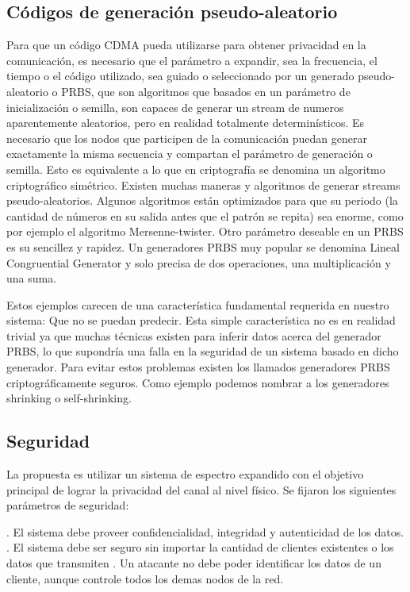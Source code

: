 \subsection{Códigos de generación pseudo-aleatorio}
\label{PRNGs} 
Para que un código CDMA pueda utilizarse para obtener privacidad en la comunicación, es necesario que el parámetro a expandir, sea la frecuencia, el tiempo o el código utilizado, sea guiado o seleccionado por un generado pseudo-aleatorio o PRBS, que son algoritmos que basados en un parámetro de inicialización o semilla, son capaces de generar un stream de numeros aparentemente aleatorios, pero en realidad totalmente determinísticos. 
Es necesario que los nodos que participen de la comunicación puedan generar exactamente la misma secuencia y compartan el parámetro de generación o semilla. Esto es equivalente a lo que en criptografía se denomina un algoritmo criptográfico simétrico.
Existen muchas maneras y algoritmos de generar streams pseudo-aleatorios. Algunos algoritmos están optimizados para que su periodo (la cantidad de números en su salida antes que el patrón se repita) sea enorme, como por ejemplo el algoritmo Mersenne-twister.
Otro parámetro deseable en un PRBS es su sencillez y rapidez. Un generadores PRBS muy popular se denomina Lineal Congruential Generator y solo precisa de dos operaciones, una multiplicación y una suma.

Estos ejemplos carecen de una característica fundamental requerida en nuestro sistema: Que no se puedan predecir. Esta simple característica no es en realidad trivial ya que muchas técnicas existen para inferir datos acerca del generador PRBS, lo que supondría una falla en la seguridad de un sistema basado en dicho generador. Para evitar estos problemas existen los llamados generadores PRBS criptográficamente seguros. Como ejemplo podemos nombrar a los generadores shrinking o self-shrinking.

\subsection{Seguridad}
La propuesta es utilizar un sistema de espectro expandido con el objetivo principal de lograr la privacidad del canal al nivel físico.
Se fijaron los siguientes parámetros de seguridad:

. El sistema debe proveer confidencialidad, integridad y autenticidad de los datos.
. El sistema debe ser seguro sin importar la cantidad de clientes existentes o los datos que transmiten
. Un atacante no debe poder identificar los datos de un cliente, aunque controle todos los demas nodos de la red.

